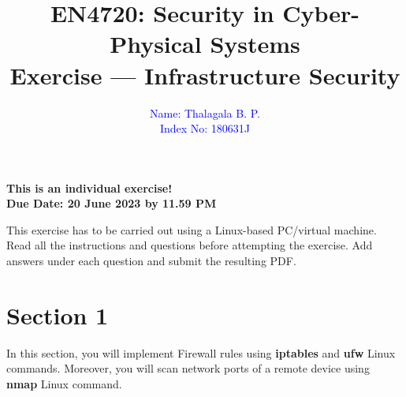 \documentclass[11pt,letterpaper]{article}
\begin{document}
	
	\title{EN4720: Security in Cyber-Physical Systems \\ Exercise --- Infrastructure Security}
	
	\author{ \textcolor{blue}{Name: Thalagala B. P.} \\ \textcolor{blue}{Index No: 180631J}}
	
	\maketitle
	
	\begin{center}
		\color{red}\bf This is an individual exercise! \\ Due Date: 20 June 2023 by 11.59 PM
	\end{center}
	
	
	\vspace{1in}
	
	This exercise has to be carried out using a Linux-based PC/virtual machine. Read all the instructions and questions before attempting the exercise. Add answers under each question and submit the resulting PDF.
	
	
	\newpage
	\section*{Section 1}
	
	In this section, you will implement Firewall rules using \textbf{iptables} and \textbf{ufw} Linux commands. Moreover, you will scan network ports of a remote device using \textbf{nmap} Linux command.  
	
\end{document}
